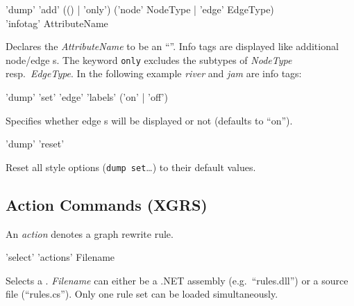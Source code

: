 \begin{rail}
  'dump' 'add' (() | 'only') ('node' NodeType | 'edge' EdgeType) \\ 'infotag' AttributeName
\end{rail}
Declares the  \emph{AttributeName} to be an ``''. Info tags are displayed like additional node/edge s. The keyword \texttt{only} excludes the subtypes of \emph{NodeType} resp.\ \emph{EdgeType}. In the following example \emph{river} and \emph{jam} are info tags:
\begin{center}
\end{center}


\begin{rail}
  'dump' 'set' 'edge' 'labels' ('on' | 'off')
\end{rail}
Specifies whether edge s will be displayed or not (defaults to ``on'').

\begin{rail}
  'dump' 'reset'
\end{rail}
Reset all style options (\texttt{dump set}\dots) to their default values.

\subsection{Action Commands (XGRS)}
\label{grsthings}
An \emph{action} denotes a graph rewrite rule.

\begin{rail}
  'select' 'actions' Filename
\end{rail}
Selects a . \emph{Filename} can either be a .NET assembly (e.g.\ ``rules.dll'') or a source file (``rules.cs''). Only one rule set can be loaded simultaneously.

